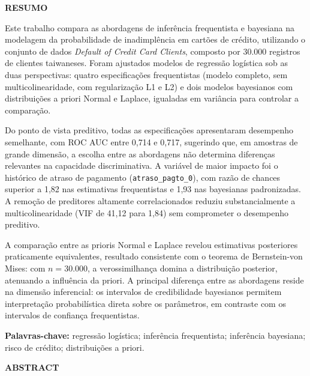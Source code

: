 \documentclass[
  brazilian,
  12pt,
  letterpaper,
  DIV=11,
  numbers=noendperiod]{scrartcl}
\begin{document}
\newpage
\begin{center}
{\bfseries\Large RESUMO}
\end{center}

\vspace{1cm}

Este trabalho compara as abordagens de inferência frequentista e bayesiana na modelagem da probabilidade de inadimplência em cartões de crédito, utilizando o conjunto de dados \textit{Default of Credit Card Clients}, composto por 30.000 registros de clientes taiwaneses. Foram ajustados modelos de regressão logística sob as duas perspectivas: quatro especificações frequentistas (modelo completo, sem multicolinearidade, com regularização L1 e L2) e dois modelos bayesianos com distribuições a priori Normal e Laplace, igualadas em variância para controlar a comparação.

Do ponto de vista preditivo, todas as especificações apresentaram desempenho semelhante, com ROC AUC entre 0,714 e 0,717, sugerindo que, em amostras de grande dimensão, a escolha entre as abordagens não determina diferenças relevantes na capacidade discriminativa. A variável de maior impacto foi o histórico de atraso de pagamento (\texttt{atraso\_pagto\_0}), com razão de chances superior a 1,82 nas estimativas frequentistas e 1,93 nas bayesianas padronizadas. A remoção de preditores altamente correlacionados reduziu substancialmente a multicolinearidade (VIF de 41,12 para 1,84) sem comprometer o desempenho preditivo.

A comparação entre as prioris Normal e Laplace revelou estimativas posteriores praticamente equivalentes, resultado consistente com o teorema de Bernstein-von Mises: com $n = 30.000$, a verossimilhança domina a distribuição posterior, atenuando a influência da priori. A principal diferença entre as abordagens reside na dimensão inferencial: os intervalos de credibilidade bayesianos permitem interpretação probabilística direta sobre os parâmetros, em contraste com os intervalos de confiança frequentistas.

\vspace{1cm}

\noindent\textbf{Palavras-chave:} regressão logística; inferência frequentista; inferência bayesiana; risco de crédito; distribuições a priori.
\newpage

\newpage
\begin{center}
{\bfseries\Large ABSTRACT}
\end{center}

\vspace{1cm}
\end{document}
